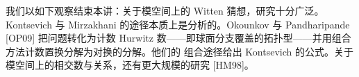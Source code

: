 
我们以如下观察结束本讲：关于模空间上的 Witten 猜想，研究十分广泛。Kontsevich 与
Mirzakhani 的途径本质上是分析的。Okounkov 与 Pandharipande [OP09] 把问题转化为计数
Hurwitz 数——即球面分支覆盖的拓扑型——并用组合方法计数置换分解为对换的分解。他们的
组合途径给出 Kontsevich 的公式。关于模空间上的相交数与关系，还有更大规模的研究 [HM98]。
